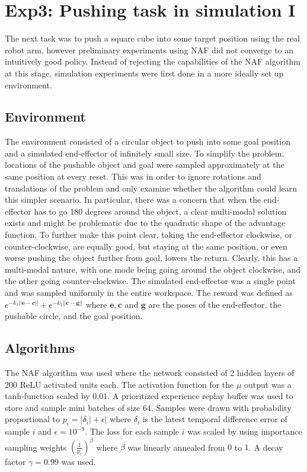 \section{Exp3: Pushing task in simulation I}
\label{sec:push_sim_1}

The next task was to push a square cube into some target position using
the real robot arm, however preliminary experiments using NAF did not
converge to an intuitively good policy. Instead of rejecting the capabilities
of the NAF algorithm at this stage, simulation experiments were first done in
a more ideally set up environment.

\subsection{Environment}

The environment consisted of a circular object to push into some goal position
and a simulated end-effector of infinitely small size. To simplify the problem,
locations of the pushable object and goal were sampled approximately at the
same position at every reset.  This was in order to ignore rotations and
translations of the problem and only examine whether the algorithm could learn
this simpler scenario. In particular, there was a concern that when the
end-effector has to go 180 degrees around the object, a clear multi-modal
solution exists and might be problematic due to the quadratic shape of the
advantage function. To further make this point clear, taking the end-effector
clockwise, or counter-clockwise, are equally good, but staying at the same
position, or even worse pushing the object further from goal, lowers the
return. Clearly, this has a multi-modal nature, with one mode being going
around the object clockwise, and the other going counter-clockwise. The
simulated end-effector was a single point and was sampled uniformly in the
entire workspace. The reward was defined as $e^{-k_1 ||\mathbf{e
- c}||} + e^{-k_2 ||\mathbf{c - g}||}$ where $\mathbf{e, c}$ and $\mathbf{g}$
are the poses of the end-effector, the pushable circle, and the goal
position.

\subsection{Algorithms}

The NAF algorithm was used where the network consisted of 2 hidden layers of
200 ReLU activated units each. The activation function for the $\mu$ output was
a tanh-function scaled by $0.01$. A prioritized experience replay buffer was
used to store and sample mini batches of size $64$. Samples were drawn with
probability proportional to $p_i = |\delta_i| + \epsilon|$ where $\delta_i$ is
the latest temporal difference error of sample $i$ and $\epsilon = 10^{-9}$.
The loss for each sample $i$ was scaled by using importance sampling weights
$\left( \frac{1}{p_i}\right) ^\beta$ where $\beta$ was linearly annealed from
$0$ to $1$. A decay factor $\gamma = 0.99$ was used.

